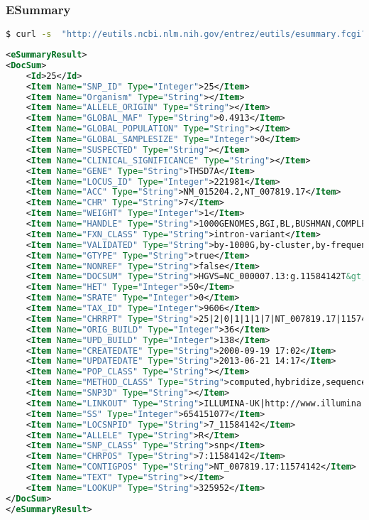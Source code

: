\documentclass{beamer}
\begin{document}
\begin{frame}[fragile]
\frametitle{ESummary}
\begin{lstlisting}[language=bash,basicstyle=\tiny,breaklines=true]
$ curl -s  "http://eutils.ncbi.nlm.nih.gov/entrez/eutils/esummary.fcgi?db=snp&id=25"
\end{lstlisting}

\begin{lstlisting}[language=xml,basicstyle=\tiny,breaklines=false]
<eSummaryResult>
<DocSum>
	<Id>25</Id>
	<Item Name="SNP_ID" Type="Integer">25</Item>
	<Item Name="Organism" Type="String"></Item>
	<Item Name="ALLELE_ORIGIN" Type="String"></Item>
	<Item Name="GLOBAL_MAF" Type="String">0.4913</Item>
	<Item Name="GLOBAL_POPULATION" Type="String"></Item>
	<Item Name="GLOBAL_SAMPLESIZE" Type="Integer">0</Item>
	<Item Name="SUSPECTED" Type="String"></Item>
	<Item Name="CLINICAL_SIGNIFICANCE" Type="String"></Item>
	<Item Name="GENE" Type="String">THSD7A</Item>
	<Item Name="LOCUS_ID" Type="Integer">221981</Item>
	<Item Name="ACC" Type="String">NM_015204.2,NT_007819.17</Item>
	<Item Name="CHR" Type="String">7</Item>
	<Item Name="WEIGHT" Type="Integer">1</Item>
	<Item Name="HANDLE" Type="String">1000GENOMES,BGI,BL,BUSHMAN,COMPLETE_GENOMICS,CSHL-HAPMAP,GMI,ILLUMINA-UK,KWOK,PERLEGEN,SSMP,TISHKOFF</Item>
	<Item Name="FXN_CLASS" Type="String">intron-variant</Item>
	<Item Name="VALIDATED" Type="String">by-1000G,by-cluster,by-frequency,by-hapmap</Item>
	<Item Name="GTYPE" Type="String">true</Item>
	<Item Name="NONREF" Type="String">false</Item>
	<Item Name="DOCSUM" Type="String">HGVS=NC_000007.13:g.11584142T&gt;C,NG_027670.1:g.292683A&gt;G,NM_015204.2:c.1454-1398A&gt;G,NT_007819.17:g.11574142T&gt;C|SEQ=TCTGTGAGCTTCTGCATGCAATCCT[A/G]TGCAATTGGAATTTGATAGTCCTTT|GENE=THSD7A:221981</Item>
	<Item Name="HET" Type="Integer">50</Item>
	<Item Name="SRATE" Type="Integer">0</Item>
	<Item Name="TAX_ID" Type="Integer">9606</Item>
	<Item Name="CHRRPT" Type="String">25|2|0|1|1|1|7|NT_007819.17|11574141|11584142|THSD7A|0.499848|0.00872267| |51|1|1|36|138|0| | |T:2178:0.4913</Item>
	<Item Name="ORIG_BUILD" Type="Integer">36</Item>
	<Item Name="UPD_BUILD" Type="Integer">138</Item>
	<Item Name="CREATEDATE" Type="String">2000-09-19 17:02</Item>
	<Item Name="UPDATEDATE" Type="String">2013-06-21 14:17</Item>
	<Item Name="POP_CLASS" Type="String"></Item>
	<Item Name="METHOD_CLASS" Type="String">computed,hybridize,sequence,unknown</Item>
	<Item Name="SNP3D" Type="String"></Item>
	<Item Name="LINKOUT" Type="String">ILLUMINA-UK|http://www.illumina.com/HumanGenomeNA18507_000019106_NCBI36.1_chr7_11550667</Item>
	<Item Name="SS" Type="Integer">654151077</Item>
	<Item Name="LOCSNPID" Type="String">7_11584142</Item>
	<Item Name="ALLELE" Type="String">R</Item>
	<Item Name="SNP_CLASS" Type="String">snp</Item>
	<Item Name="CHRPOS" Type="String">7:11584142</Item>
	<Item Name="CONTIGPOS" Type="String">NT_007819.17:11574142</Item>
	<Item Name="TEXT" Type="String"></Item>
	<Item Name="LOOKUP" Type="String">325952</Item>
</DocSum>
</eSummaryResult>
\end{lstlisting}
\end{frame}
\end{document}

